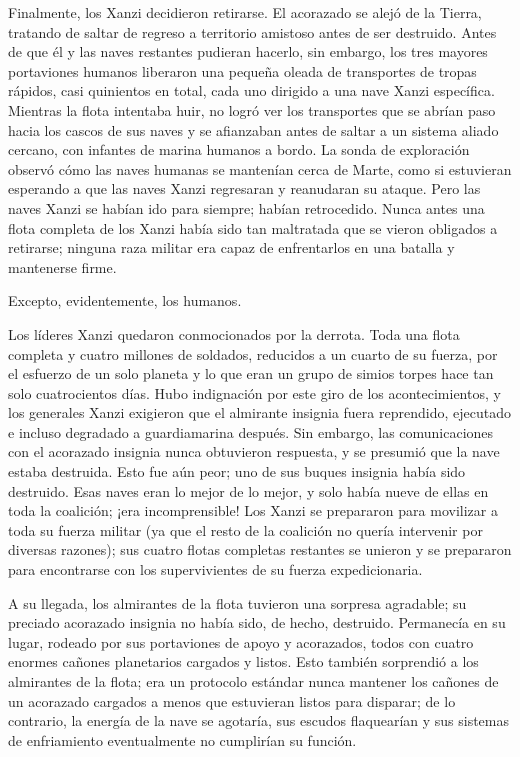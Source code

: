 \documentclass[spanish,12pt,a4paper, oneside]{book}
\begin{document}
    Finalmente, los Xanzi decidieron retirarse. El acorazado se alejó de la Tierra, tratando de saltar de regreso a territorio amistoso antes de ser destruido. Antes de que él y las naves restantes pudieran hacerlo, sin embargo, los tres mayores portaviones humanos liberaron una pequeña oleada de transportes de tropas rápidos, casi quinientos en total, cada uno dirigido a una nave Xanzi específica. Mientras la flota intentaba huir, no logró ver los transportes que se abrían paso hacia los cascos de sus naves y se afianzaban antes de saltar a un sistema aliado cercano, con infantes de marina humanos a bordo. La sonda de exploración observó cómo las naves humanas se mantenían cerca de Marte, como si estuvieran esperando a que las naves Xanzi regresaran y reanudaran su ataque. Pero las naves Xanzi se habían ido para siempre; habían retrocedido. Nunca antes una flota completa de los Xanzi había sido tan maltratada que se vieron obligados a retirarse; ninguna raza militar era capaz de enfrentarlos en una batalla y mantenerse firme.

    Excepto, evidentemente, los humanos.

    Los líderes Xanzi quedaron conmocionados por la derrota. Toda una flota completa y cuatro millones de soldados, reducidos a un cuarto de su fuerza, por el esfuerzo de un solo planeta y lo que eran un grupo de simios torpes hace tan solo cuatrocientos días. Hubo indignación por este giro de los acontecimientos, y los generales Xanzi exigieron que el almirante insignia fuera reprendido, ejecutado e incluso degradado a guardiamarina después. Sin embargo, las comunicaciones con el acorazado insignia nunca obtuvieron respuesta, y se presumió que la nave estaba destruida. Esto fue aún peor; uno de sus buques insignia había sido destruido. Esas naves eran lo mejor de lo mejor, y solo había nueve de ellas en toda la coalición; ¡era incomprensible! Los Xanzi se prepararon para movilizar a toda su fuerza militar (ya que el resto de la coalición no quería intervenir por diversas razones); sus cuatro flotas completas restantes se unieron y se prepararon para encontrarse con los supervivientes de su fuerza expedicionaria.

    A su llegada, los almirantes de la flota tuvieron una sorpresa agradable; su preciado acorazado insignia no había sido, de hecho, destruido. Permanecía en su lugar, rodeado por sus portaviones de apoyo y acorazados, todos con cuatro enormes cañones planetarios cargados y listos. Esto también sorprendió a los almirantes de la flota; era un protocolo estándar nunca mantener los cañones de un acorazado cargados a menos que estuvieran listos para disparar; de lo contrario, la energía de la nave se agotaría, sus escudos flaquearían y sus sistemas de enfriamiento eventualmente no cumplirían su función.
\end{document}
